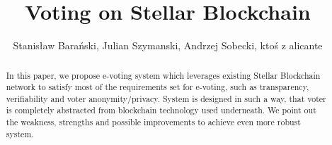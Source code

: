 \documentclass[runningheads]{llncs}
\begin{document}
%
\title{Voting on Stellar Blockchain}
%
%
\author{Stanisław Barański, Julian Szymanski, Andrzej Sobecki, ktoś z alicante}

%
%
\maketitle              %
%
\begin{abstract}
In this paper, we propose e-voting system which leverages existing Stellar Blockchain network to satisfy most of the requirements set for e-voting, such as transparency, verifiability and voter anonymity/privacy. System is designed in such a way, that voter is completely abstracted from blockchain technology used underneath. We point out the weakness, strengths and possible improvements to achieve even more robust system. 


\end{abstract}
\end{document}
